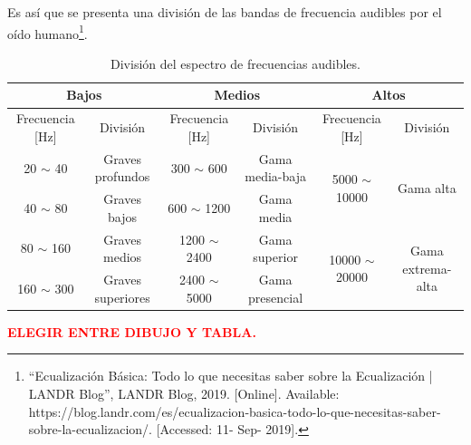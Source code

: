 \documentclass[a4paper]{article}
\begin{document}
Es así que se presenta una división de las bandas de frecuencia audibles por el oído humano\footnote{``Ecualización Básica: Todo lo que necesitas saber sobre la Ecualización | LANDR Blog'', LANDR Blog, 2019. [Online]. Available: https://blog.landr.com/es/ecualizacion-basica-todo-lo-que-necesitas-saber-sobre-la-ecualizacion/. [Accessed: 11- Sep- 2019].}.

\begin{table}[H]
\begin{center}
\hspace*{-2.75cm}
\begin{tabular}{|c|c|c|c|c|c|}
\hline
\multicolumn{2}{|c|}{Bajos}           & \multicolumn{2}{c|}{Medios}           & \multicolumn{2}{c|}{Altos}                                                  \\ \hline
Frecuencia [Hz]   & División          & Frecuencia [Hz]     & División        & Frecuencia [Hz]                        & División                           \\ \hline
20 $\sim$ 40   & Graves profundos  & 300 $\sim$ 600   & Gama media-baja & \multirow{2}{*}{5000 $\sim$ 10000}  & \multirow{2}{*}{Gama alta}         \\ \cline{1-4}
40 $\sim$ 80   & Graves bajos      & 600 $\sim$ 1200  & Gama media      &                                        &                                    \\ \hline
80 $\sim$ 160  & Graves medios     & 1200 $\sim$ 2400 & Gama superior   & \multirow{2}{*}{10000 $\sim$ 20000} & \multirow{2}{*}{Gama extrema-alta} \\ \cline{1-4}
160 $\sim$ 300 & Graves superiores & 2400 $\sim$ 5000 & Gama presencial &                                        &                                    \\ \hline
\end{tabular}
\caption{División del espectro de frecuencias audibles.}
\label{table:divfreq}
\end{center}
\end{table}


\begin{center}
\textcolor{red}{\textbf{ELEGIR ENTRE DIBUJO Y TABLA.}}
\end{center}
\end{document}

